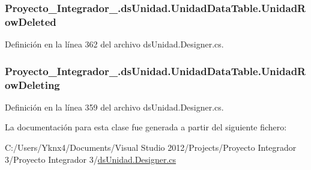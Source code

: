 \hypertarget{class_proyecto___integrador__3_1_1ds_unidad_1_1_unidad_data_table_a897e816c0d55230fc12958212955971f}{
\subsubsection[{Unidad\-Row\-Deleted}]{ Proyecto\-\_\-\-Integrador\-\_.\-ds\-Unidad.\-Unidad\-Data\-Table.\-Unidad\-Row\-Deleted}}\label{class_proyecto___integrador__3_1_1ds_unidad_1_1_unidad_data_table_a897e816c0d55230fc12958212955971f}


Definición en la línea 362 del archivo ds\-Unidad.\-Designer.\-cs.

\hypertarget{class_proyecto___integrador__3_1_1ds_unidad_1_1_unidad_data_table_ac4a46812a8ff7e0d3de13e8b0a9be97a}{
\subsubsection[{Unidad\-Row\-Deleting}]{ Proyecto\-\_\-\-Integrador\-\_.\-ds\-Unidad.\-Unidad\-Data\-Table.\-Unidad\-Row\-Deleting}}\label{class_proyecto___integrador__3_1_1ds_unidad_1_1_unidad_data_table_ac4a46812a8ff7e0d3de13e8b0a9be97a}


Definición en la línea 359 del archivo ds\-Unidad.\-Designer.\-cs.



La documentación para esta clase fue generada a partir del siguiente fichero\-:\begin{DoxyCompactItemize}
\item 
C\-:/\-Users/\-Yknx4/\-Documents/\-Visual Studio 2012/\-Projects/\-Proyecto Integrador 3/\-Proyecto Integrador 3/\hyperlink{ds_unidad_8_designer_8cs}{ds\-Unidad.\-Designer.\-cs}\end{DoxyCompactItemize}

